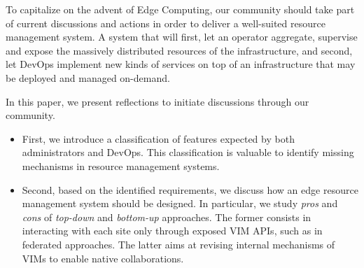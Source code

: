To capitalize on the advent of Edge Computing, our community should take part
of current discussions and actions in order to deliver a well-suited
resource management system. A system that will first, let an operator aggregate, supervise and expose the massively distributed resources of the infrastructure,
and second, let DevOps implement new kinds of services on top of an infrastructure that may be deployed and managed on-demand.


In this paper, we present reflections to initiate discussions through our community.

\begin{itemize}[noitemsep, topsep=0pt]
\item First, we introduce a classification of features expected by 
  both administrators and DevOps. This classification is valuable to
  identify missing mechanisms in resource management systems.
\item Second, based on the identified requirements, we discuss
  how an edge resource management system
  should be designed. In particular, we study \emph{pros} and
  \emph{cons} of \emph{top-down} and \emph{bottom-up} approaches. The
  former consists in interacting with each site only through
  exposed VIM APIs, such as in federated approaches. The
  latter aims at revising internal mechanisms of VIMs to enable native
  collaborations.
  \end{itemize}

